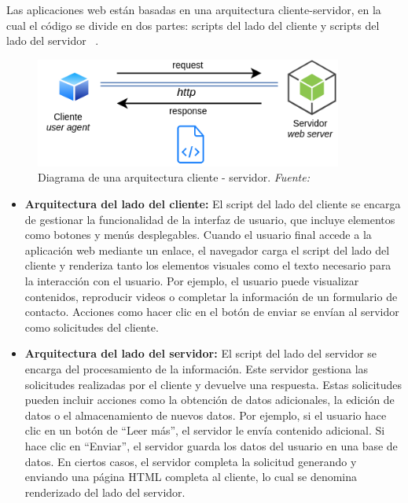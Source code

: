 Las aplicaciones web están basadas en una arquitectura cliente-servidor, en la cual el código se divide en dos partes: scripts del lado del cliente y scripts del lado del servidor ~\cite{apliacionWebAmazon}.\newline 
\begin{figure}[h]
	\centering	 
	\includegraphics[width=0.9\textwidth]{img/chapter03/ui-web-arquitectura.png}
	\caption[Diagrama de una arquitectura cliente - servidor]{Diagrama de una arquitectura cliente - servidor. \textit{Fuente: ~\cite{uqbar-wiki-web}}}
	\label{fig:cliente-servidor}  %
\end{figure}


\begin{itemize}	
	\item \textbf{Arquitectura del lado del cliente:} El script del lado del cliente se encarga de gestionar la funcionalidad de la interfaz de usuario, que incluye elementos como botones y menús desplegables. Cuando el usuario final accede a la aplicación web mediante un enlace, el navegador carga el script del lado del cliente y renderiza tanto los elementos visuales como el texto necesario para la interacción con el usuario. Por ejemplo, el usuario puede visualizar contenidos, reproducir videos o completar la información de un formulario de contacto. Acciones como hacer clic en el botón de enviar se envían al servidor como solicitudes del cliente.
	
	\item \textbf{Arquitectura del lado del servidor:} El script del lado del servidor se encarga del procesamiento de la información. Este servidor gestiona las solicitudes realizadas por el cliente y devuelve una respuesta. Estas solicitudes pueden incluir acciones como la obtención de datos adicionales, la edición de datos o el almacenamiento de nuevos datos. Por ejemplo, si el usuario hace clic en un botón de “Leer más”, el servidor le envía contenido adicional. Si hace clic en “Enviar”, el servidor guarda los datos del usuario en una base de datos. En ciertos casos, el servidor completa la solicitud generando y enviando una página HTML completa al cliente, lo cual se denomina renderizado del lado del servidor.
\end{itemize}



